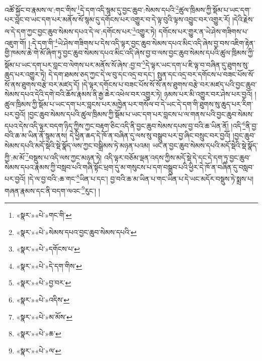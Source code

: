 འཚོ་སྐྱོང་བ་རྣམས་ལ་:གང་གིས་\footnote{«སྣར་»«པེ་»གང་གི་}དེ་དག་འདི་སྙམ་དུ་བྱང་ཆུབ་:སེམས་དཔའི་\footnote{«སྣར་»«པེ་»སེམས་དཔའ་བྱང་ཆུབ་སེམས་དཔའི་}ཚུལ་ཁྲིམས་ཀྱི་སྡོམ་པ་ཡང་དག་པར་བླང་བ་ཡང་དག་པར་མནོས་སོ་སྙམ་དུ་དགོངས་པར་འགྱུར་བ་དེ་ལྟ་བུའི་ལྟས་འབྱུང་བར་འགྱུར་རོ། །དེའི་རྗེས་ལ་དེ་དག་ཀྱང་བྱང་ཆུབ་སེམས་དཔའ་དེ་ལ་:དགོངས་པར་\footnote{«སྣར་»«པེ་»དགོངས་པ་}འགྱུར་ཏེ། དགོངས་པར་གྱུར་ན་ཡེ་ཤེས་གཟིགས་པ་འཇུག་གོ། །:དེ་དག་གི་\footnote{«སྣར་»«པེ་»དེ་དག་གིས་}ཡེ་ཤེས་གཟིགས་པ་དེས་འདི་ལྟར་བྱང་ཆུབ་སེམས་དཔའ་མིང་འདི་ཞེས་བྱ་བས་འཇིག་རྟེན་གྱི་ཁམས་ཆེ་གེ་མོ་ཞིག་ཏུ་བྱང་ཆུབ་སེམས་དཔའ་མིང་འདི་ཞེས་བྱ་བ་ལས་བྱང་ཆུབ་སེམས་དཔའི་ཚུལ་ཁྲིམས་ཀྱི་སྡོམ་པ་ཡང་དག་པར་བླང་བ་ལེགས་པར་མནོས་སོ་ཞེས་:བྱ་བ་\footnote{«སྣར་»«པེ་»བྱ་བར་}དེ་ལྟར་ཡང་དག་པ་ཇི་ལྟ་བ་བཞིན་དུ་ཐུགས་སུ་ཆུད་པར་འགྱུར་ཏེ། དེ་དག་ཐམས་ཅད་ཀྱང་དེ་ལ་བུ་དང་འདྲ་བ་དང་། སྤུན་དང་འདྲ་བར་དགོངས་པ་བཟང་པོས་སོ་སོ་ནས་ཐུགས་བརྩེ་བར་མཛད་དོ། །དེ་ལྟར་དགོངས་པ་བཟང་པོས་སོ་སོ་ནས་ཐུགས་བརྩེ་བར་མཛད་པའི་བྱང་ཆུབ་སེམས་དཔའ་དེའི་དགེ་བའི་ཆོས་རྣམས་ནི་རྒྱ་ཆེར་འཕེལ་བར་འགྱུར་ཏེ། ཉམས་པར་མི་འགྱུར་བར་ཤེས་པར་བྱའོ། །ཚུལ་ཁྲིམས་ཀྱི་སྡོམ་པ་ཡང་དག་པར་བླངས་པར་མཁྱེན་པར་གསོལ་བ་དེ་ཡང་དེ་དག་གི་ཐུགས་སུ་ཆུད་པར་རིག་པར་བྱའོ། །བྱང་ཆུབ་སེམས་དཔའི་ཚུལ་ཁྲིམས་ཀྱི་སྡོམ་པ་ཡང་དག་པར་བླངས་པ་ལ་གནས་པའི་བྱང་ཆུབ་སེམས་དཔའ་དེས་འདི་ལྟར་བདག་ཉིད་ཀྱིས་ཀྱང་བརྟག་ཅིང་འདི་ནི་བྱང་ཆུབ་སེམས་དཔས་བྱ་བའི་ཆ་ཡིན་ནོ། །འདི་\footnote{«སྣར་»«པེ་»འདིས་}ནི་བྱ་བའི་ཆ་མ་ཡིན་ནོ་སྙམ་ནས། དེ་ཕྱིན་ཆད་དེ་ཁོ་ན་བཞིན་དུ་ལས་སུ་བསྒྲུབ་པར་བྱ་ཞིང་བསྲུང་བར་བྱའོ། །བྱང་ཆུབ་སེམས་དཔའི་མདོ་སྡེའི་སྡེ་སྣོད་ལས་ཀྱང་བསྒྲིམས་ཏེ་མཉན་པའམ། ཡང་ན་བྱང་ཆུབ་སེམས་དཔའི་མདོ་སྡེའི་སྡེ་སྣོད་ཀྱི་:མ་མོ་\footnote{«སྣར་»«པེ་»མ་མོས་}བསྡུས་པ་འདི་ལས་ཀྱང་མཉན་ཏེ། འདི་ལྟར་བཅོམ་ལྡན་འདས་ཀྱིས་མདོ་སྡེ་དེ་དང་དེ་དག་ཏུ་བྱང་ཆུབ་སེམས་དཔའ་རྣམས་ཀྱི་བསླབ་པའི་གཞི་སྟོང་ཕྲག་དུ་མ་གསུངས་པ་དག་བསྒྲུབ་པའི་ཕྱིར་དེ་ཁོ་ན་བཞིན་དུ་བསླབ་པར་བྱའོ། །དེ་ལ་བྱ་བའི་:ཆ་གང་\footnote{«སྣར་»«པེ་»ཆ་}ཡིན་པ་དང་། བྱ་བའི་ཆ་མ་ཡིན་པ་གང་ཡིན་པ་དེ་ཡང་མདོར་བསྡུས་ཏེ་སྨྲས་པ། གཞན་རྣམས་དང་ནི་བདག་ལའང་\footnote{«སྣར་»«པེ་»ལ་}རུང་། །
